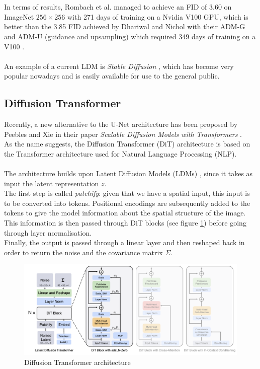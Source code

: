 \documentclass[twoside]{article}
\numberwithin{equation}{section}
\numberwithin{figure}{section}
\begin{document}
\\\\
In terms of results, Rombach et al. \cite{rombach2022highresolution} managed to achieve an FID of 3.60 on ImageNet $256 \times 256$ with 271 days of training on a Nvidia V100 GPU, which is better than the 3.85 FID achieved by Dhariwal and Nichol \cite{dhariwal2021diffusion} with their ADM-G and ADM-U (guidance and upsampling) which required 349 days of training on a V100 \cite{rombach2022highresolution}.
\\\\
An example of a current LDM is \textit{Stable Diffusion} \cite{stablediffusion, rombach2022highresolution}, which has become very popular nowadays and is easily available for use to the general public.

\subsection{Diffusion Transformer}
Recently, a new alternative to the U-Net architecture has been proposed by Peebles and Xie in their paper \textit{Scalable Diffusion Models with Transformers} \cite{peebles2023scalable}. \\
As the name suggests, the Diffusion Transformer (DiT) architecture is based on the Transformer architecture \cite{vaswani2023attention} used for Natural Language Processing (NLP).
\\\\
The architecture builds upon Latent Diffusion Models (LDMs) \cite{rombach2022highresolution}, since it takes as input the latent representation $z$. \\
The first step is called \textit{patchify}: given that we have a spatial input, this input is to be converted into tokens.
Positional encodings are subsequently added to the tokens to give the model information about the spatial structure of the image. \cite{peebles2023scalable} \\
This information is then passed through DiT blocks (see figure \ref{fig:DiT}) before going through layer normalisation. \\
Finally, the output is passed through a linear layer and then reshaped back in order to return the noise and the covariance matrix $\Sigma$. \cite{peebles2023scalable}
\begin{figure}[h]
  \begin{center}
    \includegraphics[width=\textwidth]{images/DiT.png}
    \caption{Diffusion Transformer architecture \cite{peebles2023scalable}}
    \label{fig:DiT}
  \end{center}
\end{figure}
\end{document}
